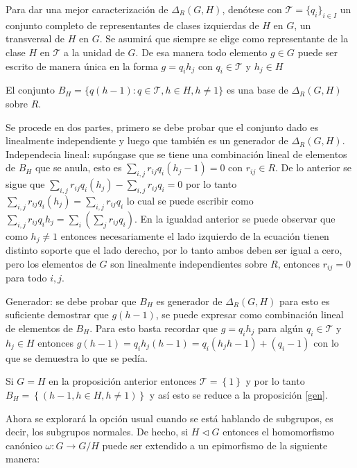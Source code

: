 Para dar una mejor caracterización de $\Delta_R (G,H)$, denótese con $\mathcal{T} = \{q_i\}_{i \in I}$ un conjunto completo de representantes de clases izquierdas de $H$ en $G$, un transversal de $H$ en $G$. Se asumirá que siempre se elige como representante de la clase $H$ en $\mathcal{T}$ a la unidad de $G$. De esa manera todo elemento $g \in G$ puede ser escrito de manera única en la forma $g = q_ih_j$ con $q_i \in \mathcal{T}$ y $h_j \in H$
\begin{proposicion}
El conjunto $B_H = \{q(h-1) : q \in \mathcal{T}, h \in H, h \neq 1  \}$ es una base de $\Delta_R(G,H)$ sobre $R$.
\end{proposicion} 
\begin{proof*}
Se procede en dos partes, primero se debe probar que el conjunto dado es linealmente independiente y luego que también es un generador de $\Delta_R(G,H)$. 
Independecia lineal: supóngase que se tiene una combinación lineal de elementos de $B_H$ que se anula, esto es $\sum_{i,j}r_{ij}q_i(h_j-1) =0 $ con $r_{ij} \in R$. De lo anterior se sigue que $\sum_{i,j}r_{ij}q_i(h_j)-\sum_{i,j}r_{ij}q_i = 0$ por lo tanto $ \sum_{i,j}r_{ij}q_i(h_j) = \sum_{i,j}r_{ij}q_i $ lo cual se puede escribir como $\sum_{i,j}r_{ij}q_ih_j =  \sum_i\left( \sum_jr_{ij}q_i \right)$. En la igualdad anterior se puede observar que como $h_j \neq 1$ entonces necesariamente el lado izquierdo de la ecuación tienen distinto soporte que el lado derecho, por lo tanto ambos deben ser igual a cero, pero los elementos de $G$ son linealmente independientes sobre $R$, entonces $r_{ij} = 0$  para todo $i,j$.

Generador: se debe probar que $B_H$ es generador de $\Delta_R(G,H)$ para esto es suficiente demostrar que $g(h-1)$,  se puede expresar  como combinación lineal de elementos de $B_H$. Para esto basta recordar que $g = q_ih_j$ para algún $q_i \in \mathcal{T}$ y $h_j \in H$ entonces $g(h-1) = q_ih_j(h-1) = q_i(h_jh-1)+ (q_i-1) $ con lo que se demuestra lo que se pedía. 
\end{proof*}
\begin{nota}
Si $G=H$ en la proposición anterior entonces $\mathcal{T} = \left\{ 1 \right\}$ y por lo tanto $B_H = \left\{ (h-1 , h \in H, h \neq 1) \right\}$ y así esto se reduce a la proposición \ref{gen}. 
\end{nota}
Ahora se explorará la opción usual cuando se está hablando de subgrupos, es decir, los subgrupos normales. De hecho, si $H \lhd G$ entonces el homomorfismo canónico $\omega : G \to G/H$ puede ser extendido a un epimorfismo de la siguiente manera: 
